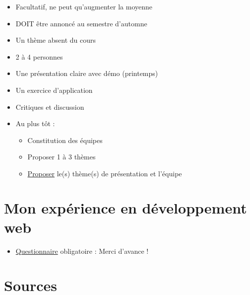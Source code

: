 \begin{itemize}
\tightlist
\item
  Facultatif, ne peut qu'augmenter la moyenne
\item
  DOIT être annoncé au semestre d'automne
\item
  Un thème absent du cours
\item
  2 à 4 personnes
\item
  Une présentation claire avec démo (printemps)
\item
  Un exercice d'application
\item
  Critiques et discussion
\item
  Au plus tôt :

  \begin{itemize}
  \tightlist
  \item
    Constitution des équipes
  \item
    Proposer 1 à 3 thèmes
  \item
    \href{https://docs.google.com/spreadsheet/viewform?formkey=dEVJRE1WVTVPelhFcE94TGF5N1c0cGc6MQ}{Proposer}
    le(s) thème(s) de présentation et l'équipe
  \end{itemize}
\end{itemize}

\hypertarget{mon-expuxe9rience-en-duxe9veloppement-web}{%
\section{Mon expérience en développement
web}\label{mon-expuxe9rience-en-duxe9veloppement-web}}

\begin{itemize}
\tightlist
\item
  \href{https://docs.google.com/spreadsheet/viewform?formkey=dDg5Znh5akRBV1hPbC1qYlVRV3BONFE6MQ}{Questionnaire}
  obligatoire : Merci d'avance !
\end{itemize}

\begin{otherlanguage}{english}

\end{otherlanguage}

\begin{otherlanguage}{english}

\end{otherlanguage}

\begin{otherlanguage}{english}

\end{otherlanguage}

\hypertarget{sources}{%
\section{Sources}\label{sources}}
